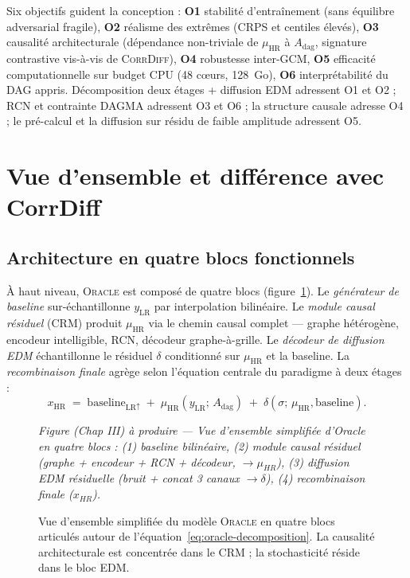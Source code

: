 \documentclass[14pt,a4paper,openany]{extreport}
\theoremstyle{definition}
\newcommand{\Oracle}{\textsc{Oracle}}
\newcommand{\CorrDiff}{\textsc{CorrDiff}}
\newcommand{\LR}{\ensuremath{\text{LR}}}
\newcommand{\HR}{\ensuremath{\text{HR}}}
\newcommand{\xHR}{\ensuremath{x_{\HR}}}
\newcommand{\yLR}{\ensuremath{y_{\LR}}}
\newcommand{\muHR}{\ensuremath{\mu_{\HR}}}
\newcommand{\Adag}{\ensuremath{A_{\mathrm{dag}}}}
\newcommand{\figplaceholder}[2][0.9\linewidth]{%
  \begin{tcolorbox}[width=#1,height=5cm,valign=center,colback=gray!8,colframe=gray!45,arc=2pt,boxrule=0.5pt]
    \centering\small\textit{#2}
  \end{tcolorbox}%
}
\begin{document}
Six objectifs guident la conception : \textbf{O1} stabilité d'entraînement (sans équilibre adversarial fragile), \textbf{O2} réalisme des extrêmes (CRPS et centiles élevés), \textbf{O3} causalité architecturale (dépendance non-triviale de $\muHR$ à $\Adag$, signature contrastive vis-à-vis de \CorrDiff{}), \textbf{O4} robustesse inter-GCM, \textbf{O5} efficacité computationnelle sur budget CPU (48 cœurs, 128~Go), \textbf{O6} interprétabilité du DAG appris. Décomposition deux étages + diffusion EDM adressent O1 et O2 ; RCN et contrainte DAGMA adressent O3 et O6 ; la structure causale adresse O4 ; le pré-calcul et la diffusion sur résidu de faible amplitude adressent O5.

\section{Vue d'ensemble et différence avec CorrDiff}
\label{sec:oracle-overview}

\subsection{Architecture en quatre blocs fonctionnels}
\label{ssec:oracle-blocs}

À haut niveau, \Oracle{} est composé de quatre blocs (figure~\ref{fig:oracle-overview-simple}). Le \emph{générateur de baseline} sur-échantillonne $\yLR$ par interpolation bilinéaire. Le \emph{module causal résiduel} (CRM) produit $\muHR$ via le chemin causal complet — graphe hétérogène, encodeur intelligible, RCN, décodeur graphe-à-grille. Le \emph{décodeur de diffusion EDM} échantillonne le résiduel $\delta$ conditionné sur $\muHR$ et la baseline. La \emph{recombinaison finale} agrège selon l'équation centrale du paradigme à deux étages :
\begin{equation}
  \xHR \;=\; \mathrm{baseline}_{\LR \uparrow} \;+\; \muHR\!\left(\yLR;\, \Adag\right) \;+\; \delta\!\left(\sigma;\, \muHR, \mathrm{baseline}\right).
  \label{eq:oracle-decomposition}
\end{equation}

\begin{figure}[ht]
  \centering
  \figplaceholder{Figure (Chap III) à produire --- Vue d'ensemble simplifiée d'Oracle en quatre blocs : (1) baseline bilinéaire, (2) module causal résiduel (graphe + encodeur + RCN + décodeur, $\to \mu_{HR}$), (3) diffusion EDM résiduelle (bruit + concat 3 canaux $\to \delta$), (4) recombinaison finale ($x_{HR}$).}
  \caption{Vue d'ensemble simplifiée du modèle \Oracle{} en quatre blocs articulés autour de l'équation~\eqref{eq:oracle-decomposition}. La causalité architecturale est concentrée dans le CRM ; la stochasticité réside dans le bloc EDM.}
  \label{fig:oracle-overview-simple}
\end{figure}
\end{document}
